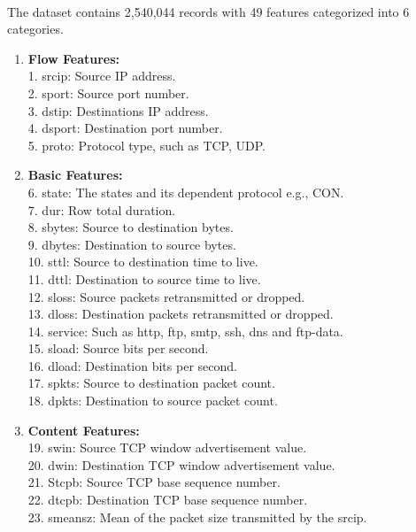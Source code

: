 \paragraph{}
The dataset contains 2,540,044 records with 49 features categorized into 6 categories.
\begin{enumerate}
\item \textbf{Flow Features:} \\
    1. srcip: Source IP address. \\
    2. sport: Source port number. \\
    3. dstip: Destinations IP address. \\
    4. dsport: Destination port number. \\
    5. proto: Protocol type, such as TCP, UDP.
\item \textbf{Basic Features:} \\
    6. state: The states and its dependent protocol e.g., CON. \\
    7. dur: Row total duration. \\
    8. sbytes: Source to destination bytes. \\
    9. dbytes: Destination to source bytes. \\
    10. sttl: Source to destination time to live. \\
    11. dttl: Destination to source time to live. \\
    12. sloss: Source packets retransmitted or dropped. \\
    13. dloss: Destination packets retransmitted or dropped. \\
    14. service: Such as http, ftp, smtp, ssh, dns and ftp-data. \\
    15. sload: Source bits per second. \\
    16. dload: Destination bits per second. \\
    17. spkts: Source to destination packet count. \\
    18. dpkts: Destination to source packet count.
\item \textbf{Content Features:} \\
    19. swin: Source TCP window advertisement value. \\
    20. dwin: Destination TCP window advertisement value. \\
    21. Stcpb: Source TCP base sequence number. \\
    22. dtcpb: Destination TCP base sequence number. \\
    23. smeansz: Mean of the packet size transmitted by the srcip. \\

\end{enumerate}
